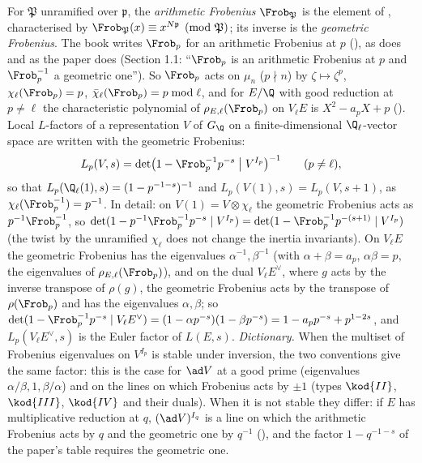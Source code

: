\begin{convention}\label{conv:ant:frobenius}
For $\mathfrak P$ unramified over $\mathfrak p$, the \emph{arithmetic Frobenius} $\Frob_{\mathfrak P}$ is the element of , characterised
by $\Frob_{\mathfrak P}(x)\equiv x^{N\mathfrak p}\pmod{\mathfrak P}$; its inverse is the \emph{geometric Frobenius}. The book writes $\Frob_p$ for an
arithmetic Frobenius at $p$ (), as  does and as the paper does (Section 1.1: ``$\Frob_p$ is an arithmetic Frobenius
at $p$ and $\Frob_p^{-1}$ a geometric one''). So $\Frob_p$ acts on $\mu_n$ ($p\nmid n$) by $\zeta\mapsto\zeta^p$, $\chi_\ell(\Frob_p)=p$,
$\bar\chi_\ell(\Frob_p)=p\bmod\ell$, and for $E/\Q$ with good reduction at $p\ne\ell$ the characteristic polynomial of $\rho_{E,\ell}(\Frob_p)$ on $V_\ell E$ is
$X^2-a_pX+p$ (). Local $L$-factors of a representation $V$ of $G_\Q$ on a finite-dimensional $\Q_\ell$-vector space are
written with the geometric Frobenius:
\[
L_p(V,s)=\det\bigl(1-\Frob_p^{-1}p^{-s}\bigm|V^{I_p}\bigr)^{-1}\qquad(p\ne\ell),
\]
so that $L_p(\Q_\ell(1),s)=(1-p^{-1-s})^{-1}$ and $L_p(V(1),s)=L_p(V,s+1)$, as $\chi_\ell(\Frob_p^{-1})=p^{-1}$. In detail: on $V(1)=V\otimes\chi_\ell$ the
geometric Frobenius acts as $p^{-1}\Frob_p^{-1}$, so $\det(1-p^{-1}\Frob_p^{-1}p^{-s}\mid V^{I_p})=\det(1-\Frob_p^{-1}p^{-(s+1)}\mid V^{I_p})$ (the twist by the
unramified $\chi_\ell$ does not change the inertia invariants). On $V_\ell E$ the geometric Frobenius has the
eigenvalues $\alpha^{-1},\beta^{-1}$ (with $\alpha+\beta=a_p$, $\alpha\beta=p$, the eigenvalues of $\rho_{E,\ell}(\Frob_p)$), and on the dual $V_\ell E^\vee$, where
$g$ acts by the inverse transpose of $\rho(g)$, the geometric Frobenius acts by the transpose of $\rho(\Frob_p)$ and has the eigenvalues $\alpha,\beta$; so
$\det(1-\Frob_p^{-1}p^{-s}\mid V_\ell E^\vee)=(1-\alpha p^{-s})(1-\beta p^{-s})=1-a_pp^{-s}+p^{1-2s}$, and $L_p(V_\ell E^\vee,s)$ is the Euler factor of $L(E,s)$. \emph{Dictionary.} When the multiset of Frobenius eigenvalues on
$V^{I_p}$ is stable under inversion, the two conventions give the same factor: this is the case for $\ad V$ at a good prime (eigenvalues
$\alpha/\beta,1,\beta/\alpha$) and on the lines on which Frobenius acts by $\pm1$ (types $\kod{II}$, $\kod{III}$, $\kod{IV}$ and their duals). When it is not
stable they differ: if $E$ has multiplicative reduction at $q$, $(\ad V)^{I_q}$ is a line on which the arithmetic Frobenius acts by $q$ and the geometric one by
$q^{-1}$ (), and the factor $1-q^{-1-s}$ of the paper's table requires the geometric one.
\end{convention}

